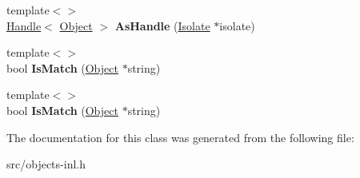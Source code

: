\begin{DoxyCompactItemize}
\item 
\hypertarget{classv8_1_1internal_1_1_sub_string_key_a6bcf8fd45297c851de09b3b6ff5444ca}{}{\footnotesize template$<$$>$ }\\\hyperlink{classv8_1_1internal_1_1_handle}{Handle}$<$ \hyperlink{classv8_1_1internal_1_1_object}{Object} $>$ {\bfseries As\+Handle} (\hyperlink{classv8_1_1internal_1_1_isolate}{Isolate} $\ast$isolate)\label{classv8_1_1internal_1_1_sub_string_key_a6bcf8fd45297c851de09b3b6ff5444ca}

\item 
\hypertarget{classv8_1_1internal_1_1_sub_string_key_a8b272accdf0d3018bf51698536e68ebf}{}{\footnotesize template$<$$>$ }\\bool {\bfseries Is\+Match} (\hyperlink{classv8_1_1internal_1_1_object}{Object} $\ast$string)\label{classv8_1_1internal_1_1_sub_string_key_a8b272accdf0d3018bf51698536e68ebf}

\item 
\hypertarget{classv8_1_1internal_1_1_sub_string_key_a0dd8275967eca58b910503bb2d8f6f86}{}{\footnotesize template$<$$>$ }\\bool {\bfseries Is\+Match} (\hyperlink{classv8_1_1internal_1_1_object}{Object} $\ast$string)\label{classv8_1_1internal_1_1_sub_string_key_a0dd8275967eca58b910503bb2d8f6f86}

\end{DoxyCompactItemize}


The documentation for this class was generated from the following file\+:\begin{DoxyCompactItemize}
\item 
src/objects-\/inl.\+h\end{DoxyCompactItemize}

